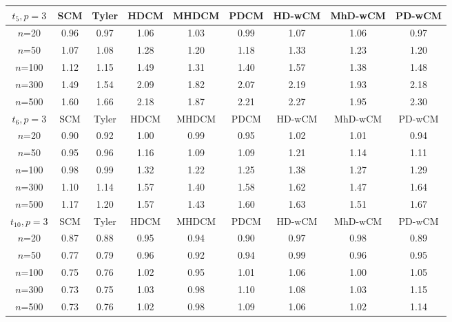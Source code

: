 %
\begin{table}[ht]
\begin{footnotesize}
   \begin{tabular}{c|cc|ccc|ccc}
    \hline
    $t_5, p=3$    & SCM  & Tyler & HDCM & MHDCM & PDCM & HD-wCM & MhD-wCM & PD-wCM \\ \hline
    $n$=20             & 0.96 & 0.97  & 1.06   & 1.03   & 0.99  & 1.07    & 1.06    & 0.97   \\
    $n$=50             & 1.07 & 1.08  & 1.28   & 1.20   & 1.18  & 1.33    & 1.23    & 1.20   \\
    $n$=100            & 1.12 & 1.15  & 1.49   & 1.31   & 1.40  & 1.57    & 1.38    & 1.48   \\
    $n$=300            & 1.49 & 1.54  & 2.09   & 1.82   & 2.07  & 2.19    & 1.93    & 2.18   \\
    $n$=500            & 1.60 & 1.66  & 2.18   & 1.87   & 2.21  & 2.27    & 1.95    & 2.30   \\ \hline
    $t_6, p=3$    & SCM  & Tyler & HDCM & MHDCM & PDCM & HD-wCM & MhD-wCM & PD-wCM \\ \hline
    $n$=20             & 0.90 & 0.92  & 1.00   & 0.99   & 0.95  & 1.02    & 1.01    & 0.94   \\
    $n$=50             & 0.95 & 0.96  & 1.16   & 1.09   & 1.09  & 1.21    & 1.14    & 1.11   \\
    $n$=100            & 0.98 & 0.99  & 1.32   & 1.22   & 1.25  & 1.38    & 1.27    & 1.29   \\
    $n$=300            & 1.10 & 1.14  & 1.57   & 1.40   & 1.58  & 1.62    & 1.47    & 1.64   \\
    $n$=500            & 1.17 & 1.20  & 1.57   & 1.43   & 1.60  & 1.63    & 1.51    & 1.67   \\ \hline
    $t_{10}, p=3$ & SCM  & Tyler & HDCM & MHDCM & PDCM & HD-wCM & MhD-wCM & PD-wCM \\ \hline
    $n$=20             & 0.87 & 0.88  & 0.95   & 0.94   & 0.90  & 0.97    & 0.98    & 0.89   \\
    $n$=50             & 0.77 & 0.79  & 0.96   & 0.92   & 0.94  & 0.99    & 0.96    & 0.95   \\
    $n$=100            & 0.75 & 0.76  & 1.02   & 0.95   & 1.01  & 1.06    & 1.00    & 1.05   \\
    $n$=300            & 0.73 & 0.75  & 1.03   & 0.98   & 1.10  & 1.08    & 1.03    & 1.15   \\
    $n$=500            & 0.73 & 0.76  & 1.02   & 0.98   & 1.09  & 1.06    & 1.02    & 1.14   \\ \hline

\end{tabular}
\end{footnotesize}
\end{table}
